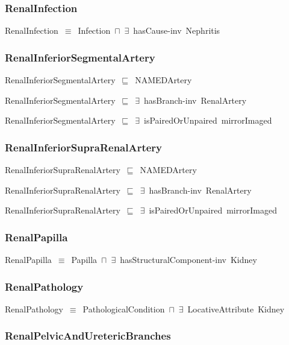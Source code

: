 \documentclass{article}
\begin{document}
\subsubsection*{RenalInfection}

RenalInfection~\ensuremath{\equiv}~Infection~\ensuremath{\sqcap}~\ensuremath{\exists}~hasCause-inv~Nephritis

\subsubsection*{RenalInferiorSegmentalArtery}

RenalInferiorSegmentalArtery~\ensuremath{\sqsubseteq}~NAMEDArtery~

RenalInferiorSegmentalArtery~\ensuremath{\sqsubseteq}~\ensuremath{\exists}~hasBranch-inv~RenalArtery~

RenalInferiorSegmentalArtery~\ensuremath{\sqsubseteq}~\ensuremath{\exists}~isPairedOrUnpaired~mirrorImaged~

\subsubsection*{RenalInferiorSupraRenalArtery}

RenalInferiorSupraRenalArtery~\ensuremath{\sqsubseteq}~NAMEDArtery~

RenalInferiorSupraRenalArtery~\ensuremath{\sqsubseteq}~\ensuremath{\exists}~hasBranch-inv~RenalArtery~

RenalInferiorSupraRenalArtery~\ensuremath{\sqsubseteq}~\ensuremath{\exists}~isPairedOrUnpaired~mirrorImaged~

\subsubsection*{RenalPapilla}

RenalPapilla~\ensuremath{\equiv}~Papilla~\ensuremath{\sqcap}~\ensuremath{\exists}~hasStructuralComponent-inv~Kidney

\subsubsection*{RenalPathology}

RenalPathology~\ensuremath{\equiv}~PathologicalCondition~\ensuremath{\sqcap}~\ensuremath{\exists}~LocativeAttribute~Kidney

\subsubsection*{RenalPelvicAndUretericBranches}
\end{document}

